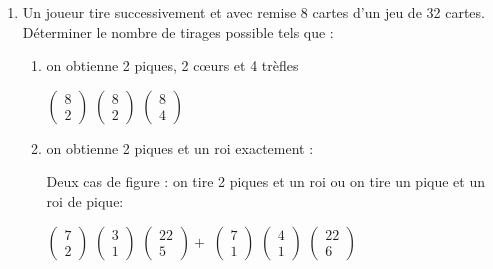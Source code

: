\documentclass[a4paper,10pt]{article}
\begin{document}
\begin{enumerate}
\begin{enumerate}
		\end{enumerate}
	
	\item Un joueur tire successivement et avec remise 8 cartes d'un jeu de 32 cartes. Déterminer le nombre de tirages possible tels que :
		\begin{enumerate}
		\item on obtienne 2 piques, 2 cœurs et 4 trèfles
		
		$\left(\begin{array}{c} 8 \\ 2 \end{array} \right)$
		$\left(\begin{array}{c} 8 \\ 2 \end{array} \right)$
		$\left(\begin{array}{c} 8 \\ 4 \end{array} \right)$
		
		\item on obtienne 2 piques et un roi exactement :
		
		Deux cas de figure : on tire 2 piques et un roi ou on tire un pique et un roi de pique:
		
		$\left(\begin{array}{c} 7 \\ 2 \end{array} \right)$
		$\left(\begin{array}{c} 3 \\ 1 \end{array} \right)$
		$\left(\begin{array}{c} 22 \\ 5 \end{array} \right)+$
		$\left(\begin{array}{c} 7 \\ 1 \end{array} \right)$
		$\left(\begin{array}{c} 4 \\ 1 \end{array} \right)$
		$\left(\begin{array}{c} 22 \\ 6 \end{array} \right)$
		\end{enumerate}
	\end{enumerate}
	
\end{document}
